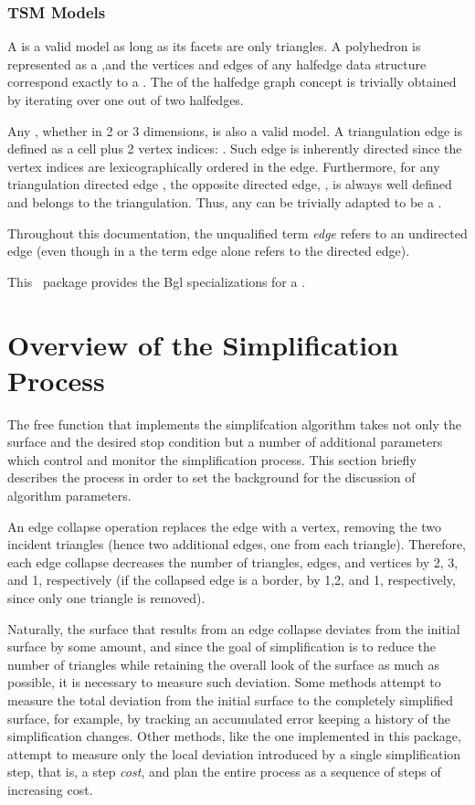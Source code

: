\subsubsection{TSM Models}

A  is a valid  model as long as its facets are only triangles. A polyhedron is represented as a ,and the vertices and edges of any halfedge data structure correspond exactly to a . The  of the halfedge graph concept is trivially obtained by iterating over one out of two halfedges.

Any , whether in 2 or 3 dimensions, is also a valid  model. A triangulation edge is defined as a cell plus 2 vertex indices: . Such edge is inherently directed since the vertex indices are lexicographically ordered in the edge. Furthermore, for any triangulation directed edge , the opposite directed edge, , is always well defined and belongs to the triangulation. Thus, any  can be trivially adapted to be a . 

Throughout this documentation, the unqualified term {\em edge} refers to an undirected edge (even though in a  the term edge alone refers to the directed edge).

This \cgal\ package provides the {\sc Bgl} specializations for a .

\section{Overview of the Simplification Process}

The free function that implements the simplifcation algorithm takes not only the surface and the desired stop condition but a number of additional parameters which control and monitor the simplification process. This section briefly describes the process in order to set the background for the discussion of algorithm parameters.

An edge collapse operation replaces the edge with a vertex, removing the two incident triangles (hence two additional edges, one from each triangle). Therefore, each edge collapse decreases the number of triangles, edges, and vertices by 2, 3, and 1, respectively (if the collapsed edge is a border, by 1,2, and 1, respectively, since only one triangle is removed).

Naturally, the surface that results from an edge collapse deviates from the initial surface by some amount, and since the goal of simplification is to reduce the number of triangles while retaining the overall look of the surface as much as possible, it is necessary to measure such deviation. Some methods attempt to measure the total deviation from the initial surface to the completely simplified surface, for example, by tracking an accumulated error keeping a history of the simplification changes. Other methods, like the one implemented in this package, attempt to measure only the local deviation introduced by a single simplification step, that is, a step {\em cost}, and plan the entire process as a sequence of steps of increasing cost. 


